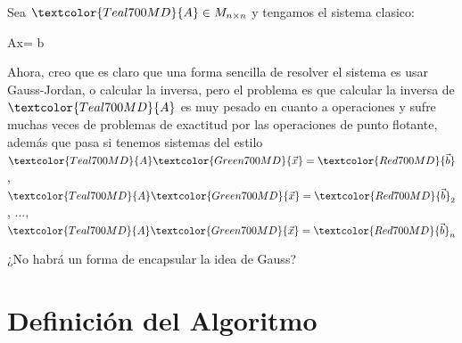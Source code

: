 \documentclass[12pt, fleqn]{report}                             %
\def \Eq {equation}                                             %
\newenvironment{MultiLineEquation*}[1]                          %
        {\begin{\Eq*}\begin{alignedat}{#1}}                         %
        {\end{alignedat}\end{\Eq*}}                                 %
\newenvironment{largeEq} {\begingroup \large}{\endgroup}        %
\theoremstyle{break}                                            %
\newcommand{\Color}[2]{\textcolor{#1}{#2}}                      %
\newcommand \ColorMatrixA       {Teal700MD}                     %
\newcommand \ColorVecX          {Green700MD}                    %
\newcommand \ColorVecB          {Red700MD}                      %
\newcommand \MatrixA      {\Color{\ColorMatrixA}{A}}            %
\newcommand \VecX         {\Color{\ColorVecX}{\vec x}}          %
\newcommand \VecB         {\Color{\ColorVecB}{\vec b}}          %
\begin{document}
            Sea $\MatrixA \in M_{n \times n}$ y tengamos el sistema
            clasico:
            \begin{largeEq}
                \begin{MultiLineEquation*}{3}
                    \MatrixA \VecX = \VecB
                \end{MultiLineEquation*}
            \end{largeEq}

            Ahora, creo que es claro que una forma sencilla de resolver el sistema es usar Gauss-Jordan, o calcular
            la inversa,
            pero el problema es que calcular la inversa de $\MatrixA$ es muy pesado en cuanto a operaciones
            y sufre muchas veces de problemas de exactitud por las operaciones de punto flotante, además que pasa
            si tenemos sistemas del estilo $\MatrixA \VecX = \VecB$, $\MatrixA \VecX = \VecB_2$, ..., $\MatrixA \VecX = \VecB_n$
                
            ¿No habrá un forma de encapsular la idea de Gauss?
                
        \clearpage
        \section{Definición del Algoritmo}
\end{document}
